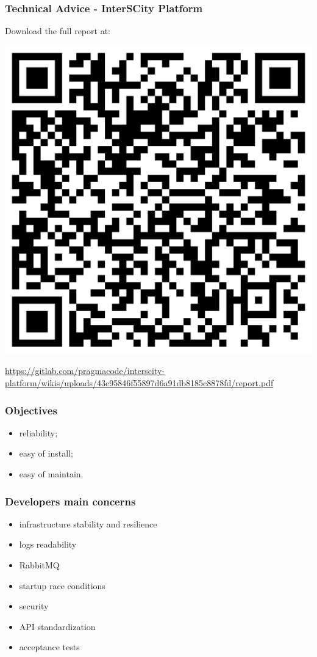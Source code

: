 \documentclass{beamer}
\begin{document}
  \begin{frame}
    \frametitle{Technical Advice - InterSCity Platform}

    \begin{center}
      Download the full report at:

      \vspace{1em}

      \includegraphics[width=.45\textwidth]{qrcode}

      \vspace{.5em}

      {\tiny \url{https://gitlab.com/pragmacode/interscity-platform/wikis/uploads/43c95846f55897d6a91db8185c8878fd/report.pdf}}
    \end{center}
  \end{frame}

  \begin{frame}
    \frametitle{Objectives}

    \begin{itemize}
      \item reliability;
      \item easy of install;
      \item easy of maintain.
    \end{itemize}
  \end{frame}

  \begin{frame}
    \frametitle{Developers main concerns}

    \begin{itemize}
      \item infrastructure stability and resilience
      \item logs readability
      \item RabbitMQ
      \item startup race conditions
      \item security
      \item API standardization
      \item acceptance tests
    \end{itemize}
  \end{frame}
\end{document}
